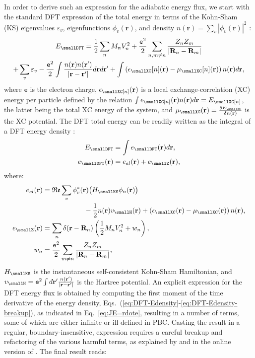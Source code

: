 In order to derive such an expression for the adiabatic energy flux, we start with the standard DFT expression of the total energy in terms of the Kohn-Sham (KS) eigenvalues $\varepsilon_v$, eigenfunctions $\phi_v(\mathbf{r})$, and density $n(\mathbf{r}) = \sum_v |\phi_v(\mathbf{r})|^2$ \citep{Martin2008}:
\begin{multline}
  E_{\smallDFT} = \frac{1}{2}\sum_{n}M_{n}V_{n}^{2} + \frac{\mathtt{e}^2}{2}\sum_{n,m\ne n}\frac{ Z_{n}Z_{m}}{|\mathbf{R}_{n}-\mathbf{R}_{m}|} \\
  + \sum_{v}\varepsilon_{v}-\frac{\mathtt{e}^2}{2}\int\frac{n(\mathbf{r})n(\mathbf{r}')}{|\mathbf{r}-\mathbf{r}'|}d\mathbf{r}d\mathbf{r}'+\int\left(\epsilon_{\smallXC}[n](\mathbf{r})-\mu_{\smallXC}[n](\mathbf{r})\right)n(\mathbf{r})d\mathbf{r},
\end{multline}
where $\mathtt{e}$ is the electron charge, $\epsilon_\smallXC[n](\mathbf{r})$ is a local exchange-correlation (XC) energy per particle defined by the relation $ \int \epsilon_\smallXC[n](\mathbf{r})n(\mathbf{r}) d\mathbf{r}=E_\smallXC [n]$, the latter being the total XC energy of the system, and $ \mu_\smallXC (\mathbf{r}) = \frac{\delta E_\smallXC }{\delta n(\mathbf{r})}$ is the XC potential. The DFT total energy can be readily written as the integral of a DFT energy density \citep{Chetty1992}:
\begin{equation}
  \begin{aligned}
    E_{\smallDFT} & =  \int e_{\smallDFT}(\mathbf{r})d\mathbf{r},\\
    e_{\smallDFT}(\mathbf{r}) & = e_{el}(\mathbf{r})+e_{\smallZ}(\mathbf{r}),
  \end{aligned}
  \label{eq:DFT-Edensity}
\end{equation}
where:
\begin{align}
  e_{el}(\mathbf{r}) & =\mathfrak{Re} \sum_{v}\phi_{v}^{*}(\mathbf{r})\bigl(H_{\smallKS}\phi_{n}(\mathbf{r})\bigr) \nonumber \\
  & \qquad\qquad\qquad - \frac{1}{2}n(\mathbf{r})v_{\smallH}(\mathbf{r}) +\left(\epsilon_\smallXC (\mathbf{r}) - \mu_\smallXC  (\mathbf{r}) \right) n(\mathbf{r}), \\
  e_{\smallZ}(\mathbf{r}) & = \sum_{n}\delta(\mathbf{r}-\mathbf{R}_{n}) \left(\frac{1}{2}M_{n}V_{n}^{2}+w_{n}\right), \\
  w_{n} & =\frac{\mathtt{e}^2}{2}\sum_{m\ne n}\frac{ Z_{n}Z_{m}}{|\mathbf{R}_{n}-\mathbf{R}_{m}|}, \label{eq:DFT-Edensity-breakup}
\end{align}
$H_\smallKS$ is the instantaneous self-consistent Kohn-Sham Hamiltonian, and $v_\smallH = \mathtt{e}^2 \int d\mathbf{r}' \frac{n(\mathbf{r}')}{|\mathbf{r}-\mathbf{r}'|}$ is the Hartree potential. An explicit expression for the DFT energy flux is obtained by computing the first moment of the time derivative of the energy density, Eqs.~(\ref{eq:DFT-Edensity}-\ref{eq:DFT-Edensity-breakup}), as indicated in Eq.~\eqref{eq:JE=rdote}, resulting in a number of terms, some of which are either infinite or ill-defined in PBC. Casting the result in a regular, boundary-insensitive, expression requires a careful breakup and refactoring of the various harmful terms, as explained by \cite{Marcolongo2014} and in the online version of \cite{Marcolongo2016}. The final result reads:
